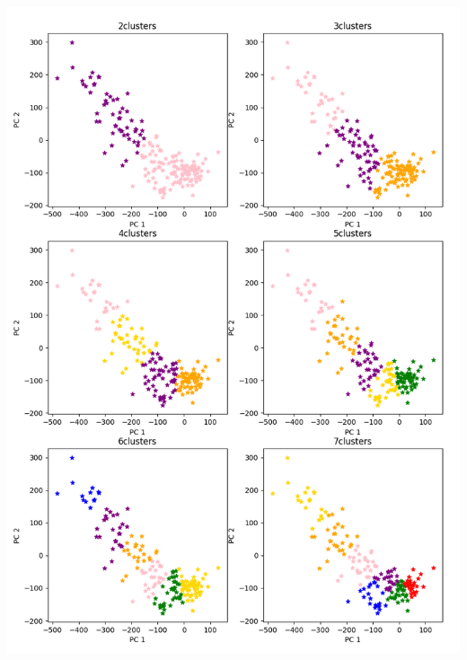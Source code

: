 \documentclass[12pt, letterpaper]{article}
\begin{document}
\begin{enumerate}[label=\Roman*.]
\begin{enumerate}[label=\arabic*.]
		 \includegraphics[scale=0.71]{clusters_2pcs.png} \\
		 

\end{enumerate}
\end{enumerate}
\end{document}
